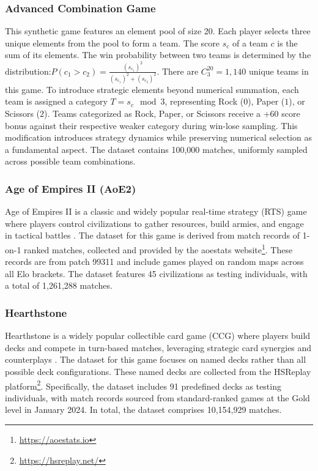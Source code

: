 \subsubsection{Advanced Combination Game}

This synthetic game features an element pool of size 20. Each player selects three unique elements from the pool to form a team. The score $s_c$ of a team $c$ is the sum of its elements. The win probability between two teams is determined by the distribution:$P(c_1>c_2)=\frac{(s_{c_1})^2}{(s_{c_1})^2+(s_{c_2})^2}$.
There are $C^{20}_3 = 1,140$ unique teams in this game. To introduce strategic elements beyond numerical summation, each team is assigned a category $T = s_c \mod 3$, representing Rock ($0$), Paper ($1$), or Scissors ($2$). Teams categorized as Rock, Paper, or Scissors receive a +60 score bonus against their respective weaker category during win-lose sampling. This modification introduces strategy dynamics while preserving numerical selection as a fundamental aspect. The dataset contains 100,000 matches, uniformly sampled across possible team combinations.

\subsubsection{Age of Empires II (AoE2)}

Age of Empires II is a classic and widely popular real-time strategy (RTS) game where players control civilizations to gather resources, build armies, and engage in tactical battles \citep{aoe2,age_of_empires_ii,age_of_empires_ii_steam}. The dataset for this game is derived from match records of 1-on-1 ranked matches, collected and provided by the aoestats website\footnote{\url{https://aoestats.io}}. These records are from patch 99311 and include games played on random maps across all Elo brackets. The dataset features 45 civilizations as testing individuals, with a total of 1,261,288 matches.

\subsubsection{Hearthstone}

Hearthstone is a widely popular collectible card game (CCG) where players build decks and compete in turn-based matches, leveraging strategic card synergies and counterplays \citep{hearthstone}. The dataset for this game focuses on named decks rather than all possible deck configurations. These named decks are collected from the HSReplay platform\footnote{\url{https://hsreplay.net/}}. Specifically, the dataset includes 91 predefined decks as testing individuals, with match records sourced from standard-ranked games at the Gold level in January 2024. In total, the dataset comprises 10,154,929 matches.

